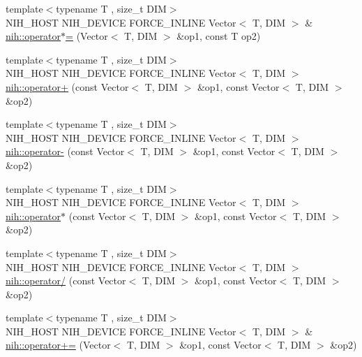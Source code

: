 \begin{DoxyCompactItemize}
\item 
{\footnotesize template$<$typename T , size\-\_\-t \-D\-I\-M$>$ }\\\-N\-I\-H\-\_\-\-H\-O\-S\-T \-N\-I\-H\-\_\-\-D\-E\-V\-I\-C\-E \*
\-F\-O\-R\-C\-E\-\_\-\-I\-N\-L\-I\-N\-E \-Vector$<$ \-T, \-D\-I\-M $>$ \& \hyperlink{group__vectors_gabaaa34dafadbdbaaff130b02d28b3ad1}{nih\-::operator$\ast$=} (\-Vector$<$ \-T, \-D\-I\-M $>$ \&op1, const \-T op2)
\item 
{\footnotesize template$<$typename T , size\-\_\-t \-D\-I\-M$>$ }\\\-N\-I\-H\-\_\-\-H\-O\-S\-T \-N\-I\-H\-\_\-\-D\-E\-V\-I\-C\-E \*
\-F\-O\-R\-C\-E\-\_\-\-I\-N\-L\-I\-N\-E \-Vector$<$ \-T, \-D\-I\-M $>$ \hyperlink{group__vectors_ga9235b9ea803b8d0ef379565a3ff7dd76}{nih\-::operator+} (const \-Vector$<$ \-T, \-D\-I\-M $>$ \&op1, const \-Vector$<$ \-T, \-D\-I\-M $>$ \&op2)
\item 
{\footnotesize template$<$typename T , size\-\_\-t \-D\-I\-M$>$ }\\\-N\-I\-H\-\_\-\-H\-O\-S\-T \-N\-I\-H\-\_\-\-D\-E\-V\-I\-C\-E \*
\-F\-O\-R\-C\-E\-\_\-\-I\-N\-L\-I\-N\-E \-Vector$<$ \-T, \-D\-I\-M $>$ \hyperlink{group__vectors_ga8782aba246b1da852d9f4390d22336f8}{nih\-::operator-\/} (const \-Vector$<$ \-T, \-D\-I\-M $>$ \&op1, const \-Vector$<$ \-T, \-D\-I\-M $>$ \&op2)
\item 
{\footnotesize template$<$typename T , size\-\_\-t \-D\-I\-M$>$ }\\\-N\-I\-H\-\_\-\-H\-O\-S\-T \-N\-I\-H\-\_\-\-D\-E\-V\-I\-C\-E \*
\-F\-O\-R\-C\-E\-\_\-\-I\-N\-L\-I\-N\-E \-Vector$<$ \-T, \-D\-I\-M $>$ \hyperlink{group__vectors_gafd7b9505e791364aa7e9b2d4598d00a6}{nih\-::operator$\ast$} (const \-Vector$<$ \-T, \-D\-I\-M $>$ \&op1, const \-Vector$<$ \-T, \-D\-I\-M $>$ \&op2)
\item 
{\footnotesize template$<$typename T , size\-\_\-t \-D\-I\-M$>$ }\\\-N\-I\-H\-\_\-\-H\-O\-S\-T \-N\-I\-H\-\_\-\-D\-E\-V\-I\-C\-E \*
\-F\-O\-R\-C\-E\-\_\-\-I\-N\-L\-I\-N\-E \-Vector$<$ \-T, \-D\-I\-M $>$ \hyperlink{group__vectors_ga7989586a3f3db4aa98a7866a4cdf080b}{nih\-::operator/} (const \-Vector$<$ \-T, \-D\-I\-M $>$ \&op1, const \-Vector$<$ \-T, \-D\-I\-M $>$ \&op2)
\item 
{\footnotesize template$<$typename T , size\-\_\-t \-D\-I\-M$>$ }\\\-N\-I\-H\-\_\-\-H\-O\-S\-T \-N\-I\-H\-\_\-\-D\-E\-V\-I\-C\-E \*
\-F\-O\-R\-C\-E\-\_\-\-I\-N\-L\-I\-N\-E \-Vector$<$ \-T, \-D\-I\-M $>$ \& \hyperlink{group__vectors_ga4226e5c3bf0305cf0a0459bf43564223}{nih\-::operator+=} (\-Vector$<$ \-T, \-D\-I\-M $>$ \&op1, const \-Vector$<$ \-T, \-D\-I\-M $>$ \&op2)

\end{DoxyCompactItemize}
